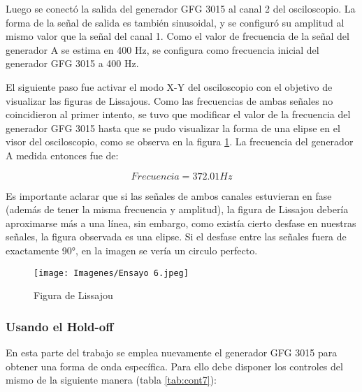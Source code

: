 Luego se conectó la salida del generador GFG
3015 al canal 2 del osciloscopio. La forma de la señal de salida es también sinusoidal, y se configuró su amplitud al mismo valor que la señal del canal 1. Como el valor de frecuencia de la señal del generador A se estima en 400 Hz, se configura como frecuencia inicial del generador GFG 3015 a 400 Hz.

El siguiente paso fue activar el modo X-Y del osciloscopio con el objetivo de visualizar las figuras de Lissajous. Como las frecuencias de ambas señales no coincidieron al primer intento, se tuvo que modificar el valor de la frecuencia del generador GFG 3015 hasta que se pudo visualizar la forma de una elipse en el visor del osciloscopio, como se observa en la figura \ref{fig::Lissajou}. La frecuencia del generador A medida entonces fue de:

$$Frecuencia = 372.01 Hz$$

Es importante aclarar que si las señales de ambos canales estuvieran en fase (además de tener la misma frecuencia y amplitud), la figura de Lissajou debería aproximarse más a una línea, sin embargo, como existía cierto desfase en nuestras señales, la figura observada es una elipse. Si el desfase entre las señales fuera de exactamente 90°, en la imagen se vería un circulo perfecto.

\begin{figure}[H]
    \centering
        \texttt{[image: Imagenes/Ensayo 6.jpeg]}
    \caption{Figura de Lissajou}
    \label{fig::Lissajou}
\end{figure}


\vspace{0.5cm}
\subsubsection{Usando el Hold-off}

En esta parte del trabajo se emplea nuevamente el generador GFG 3015 para obtener una forma de
onda específica. Para ello debe disponer los controles del mismo de la siguiente manera (tabla \ref{tab:cont7}):

\begin{table}[H]
    \centering
        \def\tablename{Tabla} 
        \caption{Disposición de controles del generador}
        \label{tab:gen7}
\end{table}


